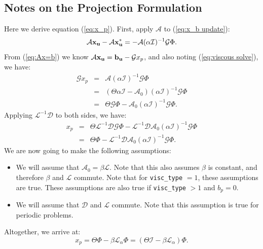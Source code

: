 \documentclass[final]{siamltex}
\def\bb {{\bf b}}
\def\ub {{\bf u}}
\def\xb {{\bf x}}
\begin{document}
\subsection{Notes on the Projection Formulation}\label{sec:projection}
Here we derive equation (\ref{eq:x_p}).  First, apply $\mathcal{A}$ to (\ref{eq:x_b update}):
\begin{equation}
\mathcal{A}\xb_{\ub} - \mathcal{A}\xb_{\ub}^* = -\mathcal{A}(\alpha\mathcal{I})^{-1}\mathcal{G}\Phi.
\end{equation}
From (\ref{eq:Ax=b}) we know $\mathcal{A}\xb_{\ub} = \bb_{\ub} - \mathcal{G} x_p$, 
and also noting (\ref{eq:viscous solve}), we have:
\begin{eqnarray}
\mathcal{G} x_p &=& \mathcal{A}(\alpha\mathcal{I})^{-1}\mathcal{G}\Phi\nonumber\\
&=& \left(\Theta\alpha\mathcal{I} - \mathcal{A}_0\right)(\alpha\mathcal{I})^{-1}\mathcal{G}\Phi\nonumber\\
&=&\Theta\mathcal{G}\Phi -\mathcal{A}_0(\alpha\mathcal{I})^{-1}\mathcal{G}\Phi.
\end{eqnarray}
Applying $\mathcal{L}^{-1}\mathcal{D}$ to both sides, we have:
\begin{eqnarray}
x_p &=& \Theta\mathcal{L}^{-1}\mathcal{D}\mathcal{G}\Phi - \mathcal{L}^{-1}\mathcal{D}\mathcal{A}_0(\alpha\mathcal{I})^{-1}\mathcal{G}\Phi\nonumber\\
&=& \Theta\Phi - \mathcal{L}^{-1}\mathcal{D}\mathcal{A}_0(\alpha\mathcal{I})^{-1}\mathcal{G}\Phi.
\end{eqnarray}
We are now going to make the following assumptions:\\
\begin{itemize}
\item We will assume that $\mathcal{A}_0 = \beta\mathcal{L}$.  Note that this also 
assumes $\beta$ is constant, and therefore $\beta$ and $\mathcal{L}$ commute.
Note that for {\tt visc\_type} $=1$, these assumptions are true.
These assumptions are also true if {\tt visc\_type} $>1$ and $b_p=0$.\\
\item We will assume that $\mathcal{D}$ and $\mathcal{L}$ commute.  Note that this 
assumption is true for periodic problems.\\
\end{itemize}
Altogether, we arrive at:
\begin{equation}
x_p = \Theta\Phi - \beta\mathcal{L}_\alpha\Phi = \left(\Theta\mathcal{I} - \beta\mathcal{L}_\alpha\right)\Phi.
\end{equation}
\end{document}

